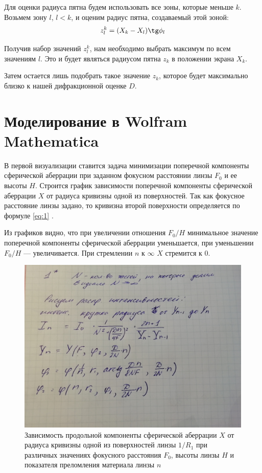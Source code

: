 \documentclass[a4paper, 12pt]{article}
\begin{document}
Для оценки радиуса пятна будем использовать все зоны, которые меньше
$k$. Возьмем зону $l$, $l<k$, и оценим радиус пятна, создаваемый этой
зоной:
\begin{equation}
    z_l^k = (X_k-X_{l})\tg \phi_{l}
    \label{eq:13}
\end{equation}

Получив набор значений $z_l^k$, нам необходимо выбрать максимум по всем
значениям $l$. Это и будет являться радиусом пятна $z_k$ в положении экрана
$X_k$.

Затем остается лишь подобрать такое значение $z_k$, которое будет
максимально близко к нашей дифракционной оценке $D$. 

\section{Моделирование в Wolfram Mathematica}
В первой визуализации ставится задача минимизации
поперечной компоненты сферической аберрации при заданном фокусном
расстоянии линзы $F_0$ и ее высоты $H$. Строится график зависимости
поперечной компоненты
сферической аберрации $X$ от радиуса кривизны одной из поверхностей. Так
как фокусное расстояние линзы задано, то кривизна второй поверхности
определяется по формуле \eqref{eq:1} .

Из графиков видно, что при увеличении отношения $F_0/H$ минимальное
значение поперечной компоненты сферической аберрации уменьшается, при
уменьшении $F_0/H$ --- увеличивается. При стремлении $n$ к $\infty$
$X$ стремится к $0$.



\begin{figure}[H]
    \includegraphics[width=0.8\linewidth]{4} 
    \caption{Зависимость продольной компоненты сферической аберрации
    $X$ от радиуса кривизны одной из поверхностей линзы $1/R_1$ при
различных значениях фокусного расстояния $F_0$, высоты линзы $H$ и
показателя преломления материала линзы $n$}
\label{fig:4}
\end{figure}
\end{document}
